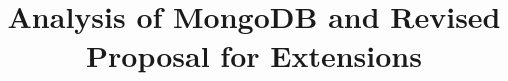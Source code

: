 \documentclass{dependencies/acm_proc_article-sp}
\begin{document}
\title{ Analysis of MongoDB and Revised Proposal for Extensions }
%
%
%
%
%
\end{document}
